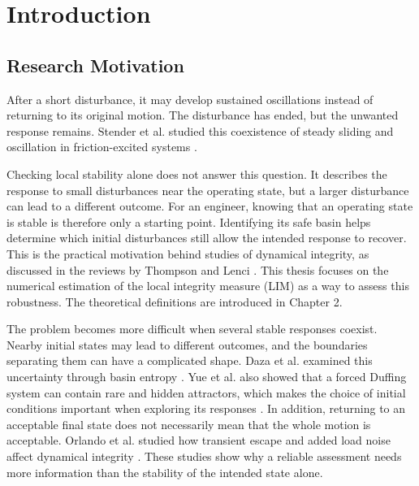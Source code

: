 \chapter{Introduction}

\label{ch:introduction}

\section{Research Motivation}


 After a short disturbance, it may develop sustained oscillations instead of returning to its original motion. The disturbance has ended, but the unwanted response remains. Stender et al. studied this coexistence of steady sliding and oscillation in friction-excited systems \cite{ref1}.

\begin{revision}
Checking local stability alone does not answer this question. It describes the response to small disturbances near the operating state, but a larger disturbance can lead to a different outcome. For an engineer, knowing that an operating state is stable is therefore only a starting point. Identifying its safe basin helps determine which initial disturbances still allow the intended response to recover. This is the practical motivation behind studies of dynamical integrity, as discussed in the reviews by Thompson \cite{ref2} and Lenci \cite{ref3}. This thesis focuses on the numerical estimation of the local integrity measure (LIM) as a way to assess this robustness. The theoretical definitions are introduced in Chapter 2.
\end{revision}

The problem becomes more difficult when several stable responses coexist. Nearby initial states may lead to different outcomes, and the boundaries separating them can have a complicated shape. Daza et al. examined this uncertainty through basin entropy \cite{ref4}. Yue et al. also showed that a forced Duffing system can contain rare and hidden attractors, which makes the choice of initial conditions important when exploring its responses \cite{ref5}. In addition, returning to an acceptable final state does not necessarily mean that the whole motion is acceptable. Orlando et al. studied how transient escape and added load noise affect dynamical integrity \cite{ref6}. These studies show why a reliable assessment needs more information than the stability of the intended state alone.

